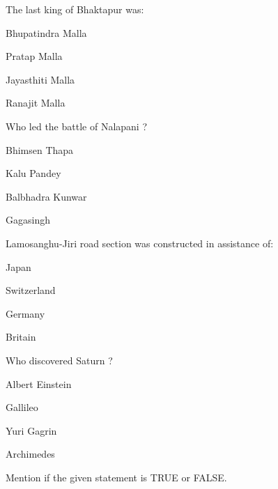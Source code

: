 \begin{questions}
\question The last king of Bhaktapur was:
  \begin{items}
  \item Bhupatindra Malla
  \item Pratap Malla
  \item Jayasthiti Malla
  \item Ranajit Malla
  \end{items}

\question Who led the battle of Nalapani ?
  \begin{items}
  \item Bhimsen Thapa
  \item Kalu Pandey
  \item Balbhadra Kunwar
  \item Gagasingh
  \end{items}

\question Lamosanghu-Jiri road section was constructed in assistance of:
  \begin{items}
  \item Japan
  \item Switzerland
  \item Germany
  \item Britain
  \end{items}

\question Who discovered Saturn ?
  \begin{items}
  \item Albert Einstein
  \item Gallileo
  \item Yuri Gagrin
  \item Archimedes
  \end{items}

\question Mention if the given statement is TRUE or FALSE.


\end{questions}
